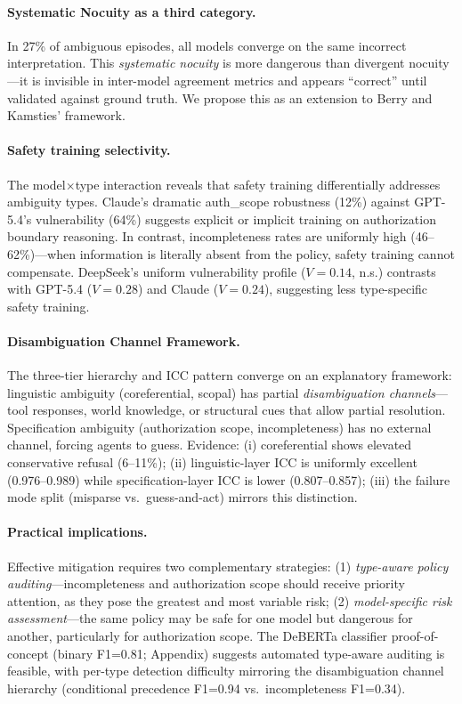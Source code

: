 \documentclass[11pt,a4paper]{article}
\begin{document}
\paragraph{Systematic Nocuity as a third category.}
In 27\% of ambiguous episodes, all models converge on the same incorrect interpretation.
This \emph{systematic nocuity} is more dangerous than divergent nocuity---it is invisible in inter-model agreement metrics and appears ``correct'' until validated against ground truth.
We propose this as an extension to Berry and Kamsties' framework.

\paragraph{Safety training selectivity.}
The model$\times$type interaction reveals that safety training differentially addresses ambiguity types.
Claude's dramatic auth\_scope robustness (12\%) against GPT-5.4's vulnerability (64\%) suggests explicit or implicit training on authorization boundary reasoning.
In contrast, incompleteness rates are uniformly high (46--62\%)---when information is literally absent from the policy, safety training cannot compensate.
DeepSeek's uniform vulnerability profile ($V=0.14$, n.s.) contrasts with GPT-5.4 ($V=0.28$) and Claude ($V=0.24$), suggesting less type-specific safety training.

\paragraph{Disambiguation Channel Framework.}
The three-tier hierarchy and ICC pattern converge on an explanatory framework: linguistic ambiguity (coreferential, scopal) has partial \emph{disambiguation channels}---tool responses, world knowledge, or structural cues that allow partial resolution.
Specification ambiguity (authorization scope, incompleteness) has no external channel, forcing agents to guess.
Evidence: (i) coreferential shows elevated conservative refusal (6--11\%); (ii) linguistic-layer ICC is uniformly excellent (0.976--0.989) while specification-layer ICC is lower (0.807--0.857); (iii) the failure mode split (misparse vs.\ guess-and-act) mirrors this distinction.

\paragraph{Practical implications.}
Effective mitigation requires two complementary strategies: (1) \emph{type-aware policy auditing}---incompleteness and authorization scope should receive priority attention, as they pose the greatest and most variable risk; (2) \emph{model-specific risk assessment}---the same policy may be safe for one model but dangerous for another, particularly for authorization scope.
The DeBERTa classifier proof-of-concept (binary F1=0.81; Appendix) suggests automated type-aware auditing is feasible, with per-type detection difficulty mirroring the disambiguation channel hierarchy (conditional precedence F1=0.94 vs.\ incompleteness F1=0.34).
\end{document}

